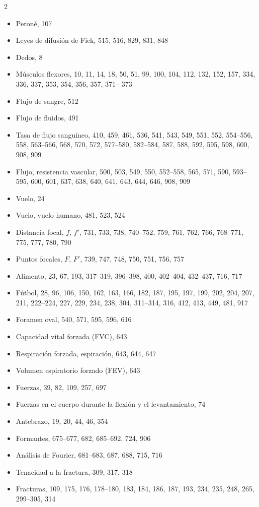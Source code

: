 \documentclass[12pt,a4paper]{book}
\begin{document}
\begin{multicols}{2}
\begin{itemize}[leftmargin=*]
  \item Peroné, 107
  \item Leyes de difusión de Fick, 515, 516, 829, 831, 848
  \item Dedos, 8
  \item Músculos flexores, 10, 11, 14, 18, 50, 51, 99, 100, 104, 112, 132, 152, 157, 334, 336, 337, 353, 354, 356, 357, 371-- 373
  \item Flujo de sangre, 512
  \item Flujo de fluidos, 491
  \item Tasa de flujo sanguíneo, 410, 459, 461, 536, 541, 543, 549, 551, 552, 554--556, 558, 563--566, 568, 570, 572, 577--580, 582--584, 587, 588, 592, 595, 598, 600, 908, 909
  \item Flujo, resistencia vascular, 500, 503, 549, 550, 552--558, 565, 571, 590, 593-- 595, 600, 601, 637, 638, 640, 641, 643, 644, 646, 908, 909
  \item Vuelo, 24
  \item Vuelo, vuelo humano, 481, 523, 524
  \item Distancia focal, $f$, $f'$, 731, 733, 738, 740--752, 759, 761, 762, 766, 768--771, 775, 777, 780, 790
  \item Puntos focales, $F$, $F'$, 739, 747, 748, 750, 751, 756, 757
  \item Alimento, 23, 67, 193, 317--319, 396--398, 400, 402--404, 432--437, 716, 717
  \item Fútbol, 28, 96, 106, 150, 162, 163, 166, 182, 187, 195, 197, 199, 202, 204, 207, 211, 222--224, 227, 229, 234, 238, 304, 311--314, 316, 412, 413, 449, 481, 917
  \item Foramen oval, 540, 571, 595, 596, 616
  \item Capacidad vital forzada (FVC), 643
  \item Respiración forzada, espiración, 643, 644, 647
  \item Volumen espiratorio forzado (FEV), 643
  \item Fuerzas, 39, 82, 109, 257, 697
  \item Fuerzas en el cuerpo durante la flexión y el levantamiento, 74
  \item Antebrazo, 19, 20, 44, 46, 354
  \item Formantes, 675--677, 682, 685--692, 724, 906
  \item Análisis de Fourier, 681--683, 687, 688, 715, 716
  \item Tenacidad a la fractura, 309, 317, 318
  \item Fracturas, 109, 175, 176, 178--180, 183, 184, 186, 187, 193, 234, 235, 248, 265, 299--305, 314

\end{itemize}
\end{multicols}
\end{document}
